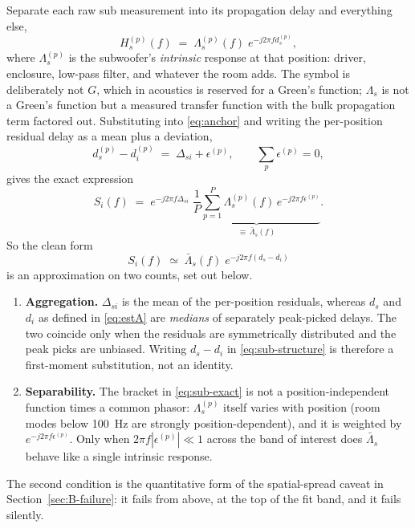 \documentclass[11pt,a4paper]{article}
\begin{document}
Separate each raw sub measurement into its propagation delay and everything
else,
%
\begin{equation}
  H_s^{(p)}(f) \;=\; \Lambda_s^{(p)}(f)\; e^{-j 2\pi f d_s^{(p)}},
  \label{eq:lambda}
\end{equation}
%
where $\Lambda_s^{(p)}$ is the subwoofer's \emph{intrinsic} response at that
position: driver, enclosure, low-pass filter, and whatever the room adds. The
symbol is deliberately not $G$, which in acoustics is reserved for a Green's
function; $\Lambda_s$ is not a Green's function but a measured transfer
function with the bulk propagation term factored out. Substituting into
\eqref{eq:anchor} and writing the per-position residual delay as a mean plus a
deviation,
%
\begin{equation}
  d_s^{(p)} - d_i^{(p)} \;=\; \Delta_{si} + \epsilon^{(p)},
  \qquad \textstyle\sum_p \epsilon^{(p)} = 0,
\end{equation}
%
gives the exact expression
%
\begin{equation}
  S_i(f) \;=\; e^{-j 2\pi f \Delta_{si}}\;
               \underbrace{\frac{1}{P}\sum_{p=1}^{P}
                 \Lambda_s^{(p)}(f)\, e^{-j 2\pi f \epsilon^{(p)}}}_{\textstyle \equiv\, \bar\Lambda_s(f)} .
  \label{eq:sub-exact}
\end{equation}
%
So the clean form
%
\begin{equation}
  S_i(f) \;\simeq\; \bar\Lambda_s(f)\; e^{-j 2\pi f (d_s - d_i)}
  \label{eq:sub-structure}
\end{equation}
%
is an approximation on two counts, set out below.
%
\begin{enumerate}[leftmargin=*]
\item \textbf{Aggregation.} $\Delta_{si}$ is the mean of the per-position
  residuals, whereas $d_s$ and $d_i$ as defined in \eqref{eq:estA} are
  \emph{medians} of separately peak-picked delays. The two coincide only when
  the residuals are symmetrically distributed and the peak picks are unbiased.
  Writing $d_s - d_i$ in \eqref{eq:sub-structure} is therefore a first-moment
  substitution, not an identity.
\item \textbf{Separability.} The bracket in \eqref{eq:sub-exact} is not a
  position-independent function times a common phasor: $\Lambda_s^{(p)}$ itself
  varies with position (room modes below \SI{100}{\hertz} are strongly
  position-dependent), and it is weighted by $e^{-j2\pi f \epsilon^{(p)}}$. Only
  when $2\pi f |\epsilon^{(p)}| \ll 1$ across the band of interest does
  $\bar\Lambda_s$ behave like a single intrinsic response.
\end{enumerate}
%
The second condition is the quantitative form of the spatial-spread caveat in
Section~\ref{sec:B-failure}: it fails from above, at the top of the fit band,
and it fails silently.
\end{document}
